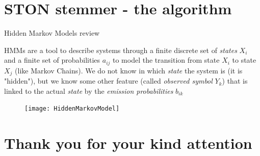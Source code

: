 \documentclass{beamer}
\begin{document}
\section{STON stemmer - the algorithm}
\begin{frame}{Hidden Markov Models review}

	HMMs are a tool to describe systems through a finite discrete set of \textit{states} $X_i$ and a finite set of probabilities $a_{ij}$ to model the transition from state $X_i$ to state $X_j$ (like Markov Chains). We do not know in which \textit{state} the system is (it is "hidden"), but we know some other feature (called \textit{observed symbol} $Y_k$) that is linked to the actual \textit{state} by the \textit{emission probabilities} $b_{ik}$
	\vspace*{-8mm}
	\begin{figure}
		\centering
		\texttt{[image: HiddenMarkovModel]}
		\label{fig:hiddenmarkovmodel}
	\end{figure}


\end{frame}

\section{Thank you for your kind attention}
\end{document}

